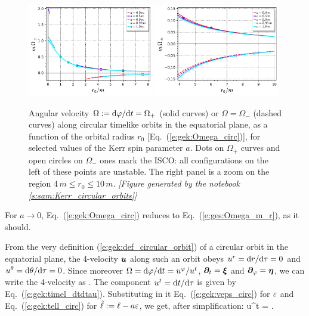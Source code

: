 \begin{figure}
\begin{center}
\includegraphics[width=0.49\textwidth]{gek_omega_circ_orb.pdf}
\includegraphics[width=0.49\textwidth]{gek_omega_circ_orb_zoom.pdf}
\end{center}
\caption[]{\label{f:gek:omega_circ_orb} \footnotesize
Angular velocity $\Omega:=\mathrm{d}\varphi/\mathrm{d} t=\Omega_+$ (solid curves) or $\Omega=\Omega_-$
(dashed curves) along circular timelike
orbits in the equatorial plane, as a function of the orbital radius $r_0$
[Eq.~(\ref{e:gek:Omega_circ})], for selected values of the Kerr spin parameter $a$.
Dots on $\Omega_+$ curves and open circles on $\Omega_-$ ones mark the ISCO: all
configurations on the left of these points are unstable.
The right panel is a zoom on the region $4\,m \leq r_0 \leq 10\,m$.
\textsl{[Figure generated by the notebook \ref{s:sam:Kerr_circular_orbits}]}
}
\end{figure}

\begin{remark}
For $a\to 0$, Eq.~(\ref{e:gek:Omega_circ}) reduces to Eq.~(\ref{e:ges:Omega_m_r}), as it should.
\end{remark}

From the very definition (\ref{e:gek:def_circular_orbit}) of a circular orbit
in the equatorial plane, the 4-velocity $\bm{u}$ along such an orbit
obeys $u^r = \mathrm{d} r/\mathrm{d}\tau = 0$ and $u^\theta = \mathrm{d}\theta/\mathrm{d}\tau = 0$. Since moreover
$\Omega = \mathrm{d}\varphi/\mathrm{d} t = u^\varphi / u^t$, $\bm{\partial}_t = \bm{\xi}$ and $\bm{\partial}_\varphi = \bm{\eta}$,
we can write the 4-velocity as
\be \label{e:gek:4vel_circ_orb}
     .
\ee
The component $u^t = \mathrm{d} t / \mathrm{d}\tau$ is given by Eq.~(\ref{e:gek:timel_dtdtau}).
Substituting in it Eq.~(\ref{e:gek:veps_circ}) for $\varepsilon$
and Eq.~(\ref{e:gek:tell_circ}) for $\tilde{\ell} := \ell - a \varepsilon$, we
get, after simplification:
\be \label{e:gek:ut_circ_orb}
    u^t =  .
\ee

